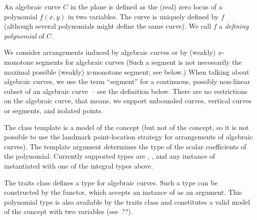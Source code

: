 An algebraic curve $C$ in the plane is defined as the (real) zero locus
of a polynomial $f(x,y)$ in two variables. The curve is uniquely defined
by $f$ (although several polynomials might define the same curve). 
We call $f$ a \emph{defining polynomial} of $C$.

We consider arrangements induced by algebraic curves
or by (weakly) $x$-monotone segments for algebraic curves
(Such a segment is not necessarily the maximal possible 
(weakly) x-monotone segment; see below.)
When talking about algebraic curves, 
we use the term ``segment'' for a continuous, possibly non-linear subset 
of an algebraic curve~-- see the definition below.
There are no restrictions on the algebraic curve, that means, 
we support unbounded curves, vertical curves or segments, and isolated points.

The  class template 
is a model of the  concept (but not of the
 concept, so it is not possible
to use the landmark point-location strategy for arrangements of
algebraic curves).
The template argument  determines 
the type of the scalar coefficients of the polynomial. 
Currently supported types are , , 
and any instance of  
instantiated with one of the integral types above.

The traits class defines a type  for algebraic curves.
Such a type can be constructed by the  functor,
which accepts an instance of  as an argument.
This polynomial type is also available by the traits class 
and constitutes a valid model
of the concept  with two variables (see~??).

